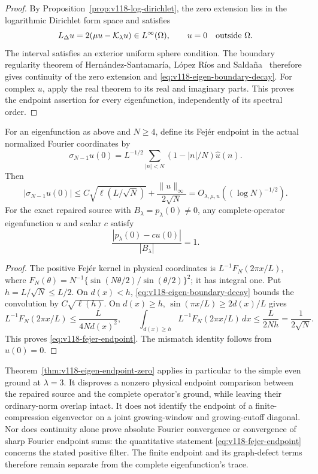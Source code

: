 \begin{proof}
By Proposition~\ref{prop:v118-log-dirichlet}, the zero extension lies
in the logarithmic Dirichlet form space and satisfies
\[
 L_\Delta u=2(\mu u-\mathcal K_\lambda u)\in L^\infty(\Omega),
 \qquad u=0\quad\hbox{outside }\Omega.
\]
The interval satisfies an exterior uniform sphere condition.
The boundary regularity theorem of Hern\'andez-Santamar\'ia,
L\'opez R\'ios and Salda\~na~\cite[Theorem~1.1]{HLSLogBoundary}
therefore gives continuity of the zero extension and
\eqref{eq:v118-eigen-boundary-decay}.  For complex $u$, apply the
real theorem to its real and imaginary parts.  This proves the endpoint
assertion for every eigenfunction, independently of its spectral order.
\end{proof}

\begin{corollary}
\label{cor:v118-ground-fejer}
For an eigenfunction as above and $N\ge4$, define its Fej\'er endpoint
in the actual normalized Fourier coordinates by
\[
 \sigma_{N-1}u(0)=L^{-1/2}
       \sum_{|n|<N}(1-|n|/N)\widehat u(n).
\]
Then
\begin{equation}\label{eq:v118-fejer-endpoint}
 |\sigma_{N-1}u(0)|
 \le C\sqrt{\ell(L/\sqrt N)}+\frac{\|u\|_\infty}{2\sqrt N}
 =O_{\lambda,\mu,u}((\log N)^{-1/2}).
\end{equation}
For the exact repaired source with $B_\lambda=p_\lambda(0)\ne0$,
any complete-operator eigenfunction $u$ and scalar $c$ satisfy
\begin{equation}\label{eq:v118-ground-source-mismatch}
 \frac{|p_\lambda(0)-cu(0)|}{|B_\lambda|}=1.
\end{equation}
\end{corollary}
\begin{proof}
The positive Fej\'er kernel in physical coordinates is
$L^{-1}F_N(2\pi x/L)$, where
$F_N(\theta)=N^{-1}\{\sin(N\theta/2)/\sin(\theta/2)\}^2$;
it has integral one.  Put $h=L/\sqrt N\le L/2$.
On $d(x)<h$, \eqref{eq:v118-eigen-boundary-decay} bounds the
convolution by $C\sqrt{\ell(h)}$.
On $d(x)\ge h$, $\sin(\pi x/L)\ge2d(x)/L$ gives
\[
 L^{-1}F_N(2\pi x/L)\le\frac{L}{4N d(x)^2},\qquad
 \int_{d(x)\ge h}L^{-1}F_N(2\pi x/L)\,dx
       \le\frac{L}{2Nh}=\frac1{2\sqrt N}.
\]
This proves \eqref{eq:v118-fejer-endpoint}.
The mismatch identity follows from $u(0)=0$.
\end{proof}

Theorem~\ref{thm:v118-eigen-endpoint-zero} applies in particular to
the simple even ground at $\lambda=3$.  It disproves a nonzero physical
endpoint comparison between the repaired source and the complete
operator's ground, while leaving their ordinary-norm overlap intact.
It does not identify the endpoint of a finite-compression eigenvector
on a joint growing-window and growing-cutoff diagonal.
Nor does continuity alone prove absolute Fourier convergence or
convergence of sharp Fourier endpoint sums: the quantitative statement
\eqref{eq:v118-fejer-endpoint} concerns the stated positive filter.
The finite endpoint and its graph-defect terms therefore remain
separate from the complete eigenfunction's trace.
